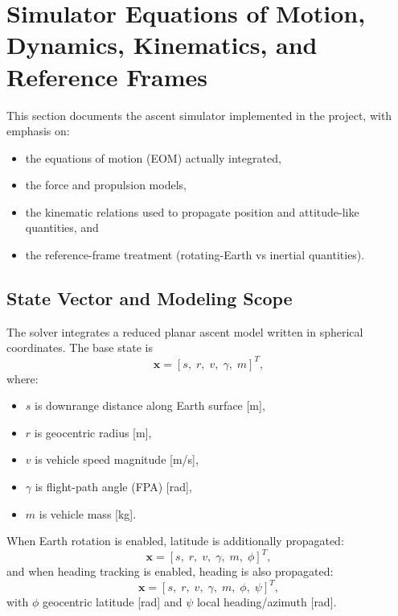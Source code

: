 \section{Simulator Equations of Motion, Dynamics, Kinematics, and Reference Frames}
\label{sec:simulator_eom_dynamics_frames}

This section documents the ascent simulator implemented in the project, with emphasis on:
\begin{itemize}
\item the equations of motion (EOM) actually integrated,
\item the force and propulsion models,
\item the kinematic relations used to propagate position and attitude-like quantities, and
\item the reference-frame treatment (rotating-Earth vs inertial quantities).
\end{itemize}

\subsection{State Vector and Modeling Scope}

The solver integrates a reduced planar ascent model written in spherical coordinates. The base state is
\begin{equation}
\mathbf{x} = [s,\; r,\; v,\; \gamma,\; m]^T,
\end{equation}
where:
\begin{itemize}
\item $s$ is downrange distance along Earth surface [m],
\item $r$ is geocentric radius [m],
\item $v$ is vehicle speed magnitude [m/s],
\item $\gamma$ is flight-path angle (FPA) [rad],
\item $m$ is vehicle mass [kg].
\end{itemize}

When Earth rotation is enabled, latitude is additionally propagated:
\begin{equation}
\mathbf{x} = [s,\; r,\; v,\; \gamma,\; m,\; \phi]^T,
\end{equation}
and when heading tracking is enabled, heading is also propagated:
\begin{equation}
\mathbf{x} = [s,\; r,\; v,\; \gamma,\; m,\; \phi,\; \psi]^T,
\end{equation}
with $\phi$ geocentric latitude [rad] and $\psi$ local heading/azimuth [rad].

